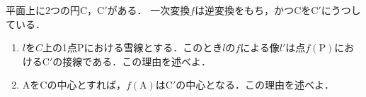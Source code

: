 \documentclass[../../main.tex]{subfiles}
\begin{document}
平面上に$2$つの円$\mathrm{C}$，$\mathrm{C'}$がある．
一次変換$f$は逆変換をもち，かつ$\mathrm{C}$を$\mathrm{C'}$にうつしている．
\begin{enumerate}
  \item $l$を$C$上の1点$\mathrm{P}$における雪線とする．このとき$l$の$f$による像$l'$は点$f(\mathrm{P})$における$\mathrm{C'}$の接線である．この理由を述べよ．
  \item $\mathrm{A}$を$\mathrm{C}$の中心とすれば，$f(\mathrm{A})$は$\mathrm{C'}$の中心となる．この理由を述べよ．
\end{enumerate}
\end{document}
